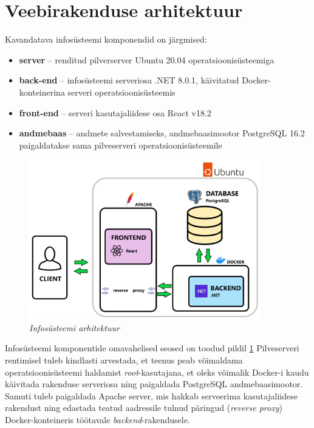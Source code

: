 \section{Veebirakenduse arhitektuur}
Kavandatava infosüsteemi komponendid on järgmised:
\begin{itemize}
    \item \textbf{server} -- renditud pilverserver Ubuntu 20.04 operatsioonisüsteemiga
    \item \textbf{back-end} -- infosüsteemi serveriosa .NET 8.0.1, käivitatud Docker-konteinerina serveri operatsioonisüsteemis
    \item \textbf{front-end} -- serveri kasutajaliidese osa React v18.2
    \item \textbf{andmebaas} -- andmete salvestamiseks, andmebaasimootor PostgreSQL 16.2 paigaldatakse sama pilveserveri operatsioonisüsteemile
\end{itemize}

\begin{figure}[ht]
    \centering
    \includegraphics[width=0.9\textwidth]{figures/analysis/architecture.png}
    \caption[Infosüsteemi arhitektuur]{\textit{Infosüsteemi arhitektuur}}
    \label{fig:architecture}
\end{figure}

Infosüsteemi komponentide omavahelised seosed on toodud pildil \ref{fig:architecture}
Pilveserveri rentimisel tuleb kindlasti arvestada, et teenus peab võimaldama operatsioonisüsteemi
haldamist \textit{root}-kasutajana, et oleks võimalik Docker-i kaudu käivitada rakenduse serveriosa ning
paigaldada PostgreSQL andmebaasimootor. Samuti tuleb paigaldada Apache server, mis hakkab 
serveerima kasutajaliidese rakendust ning edastada teatud aadressile tulnud päringud (\textit{reverse proxy})
Docker-konteineris töötavale \textit{backend}-rakendusele.